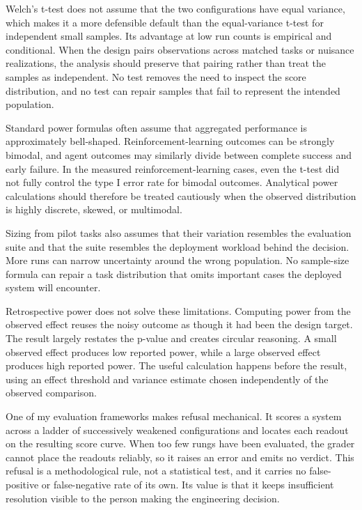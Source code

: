Welch's t-test does not assume that the two configurations have equal variance, which makes it a more defensible default than the equal-variance t-test for independent small samples. Its advantage at low run counts is empirical and conditional. When the design pairs observations across matched tasks or nuisance realizations, the analysis should preserve that pairing rather than treat the samples as independent. No test removes the need to inspect the score distribution, and no test can repair samples that fail to represent the intended population.

Standard power formulas often assume that aggregated performance is approximately bell-shaped. Reinforcement-learning outcomes can be strongly bimodal, and agent outcomes may similarly divide between complete success and early failure. In the measured reinforcement-learning cases, even the t-test did not fully control the type I error rate for bimodal outcomes. Analytical power calculations should therefore be treated cautiously when the observed distribution is highly discrete, skewed, or multimodal.

Sizing from pilot tasks also assumes that their variation resembles the evaluation suite and that the suite resembles the deployment workload behind the decision. More runs can narrow uncertainty around the wrong population. No sample-size formula can repair a task distribution that omits important cases the deployed system will encounter.

Retrospective power does not solve these limitations. Computing power from the observed effect reuses the noisy outcome as though it had been the design target. The result largely restates the p-value and creates circular reasoning. A small observed effect produces low reported power, while a large observed effect produces high reported power. The useful calculation happens before the result, using an effect threshold and variance estimate chosen independently of the observed comparison.

One of my evaluation frameworks makes refusal mechanical. It scores a system across a ladder of successively weakened configurations and locates each readout on the resulting score curve. When too few rungs have been evaluated, the grader cannot place the readouts reliably, so it raises an error and emits no verdict. This refusal is a methodological rule, not a statistical test, and it carries no false-positive or false-negative rate of its own. Its value is that it keeps insufficient resolution visible to the person making the engineering decision.


